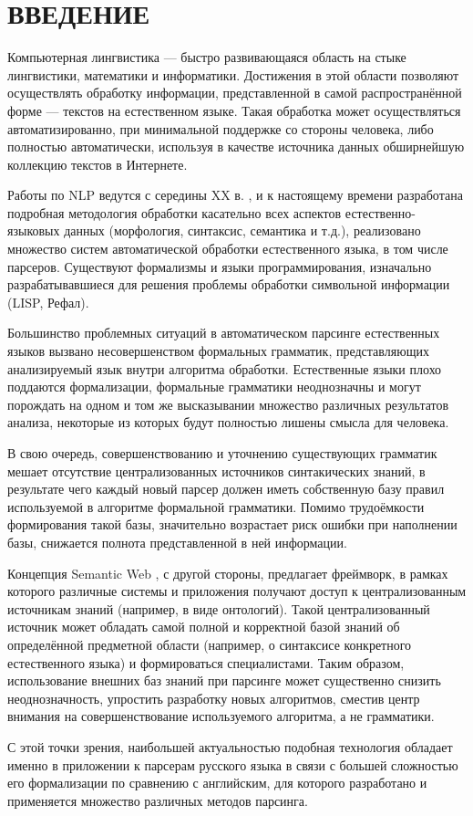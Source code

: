 \section*{\centering ВВЕДЕНИЕ}
Компьютерная лингвистика --- быстро развивающаяся область на стыке лингвистики, математики
и информатики. Достижения в этой области позволяют осуществлять обработку информации, представленной
в самой распространённой форме --- текстов на естественном языке. Такая обработка может осуществляться
автоматизированно, при минимальной поддержке со стороны человека, либо полностью автоматически, используя в качестве
источника данных обширнейшую коллекцию текстов в Интернете.

Работы по NLP ведутся с середины XX в. \cite{wiki_nlp}, и к настоящему времени разработана подробная методология
обработки касательно всех аспектов естественно-языковых данных (морфология, синтаксис, семантика и т.д.), реализовано
множество систем автоматической обработки естественного языка, в том числе парсеров. Существуют формализмы и языки программирования, 
изначально разрабатывавшиеся для решения проблемы обработки символьной информации (LISP, Рефал).

Большинство проблемных ситуаций в автоматическом парсинге естественных языков вызвано несовершенством формальных грамматик, представляющих анализируемый язык внутри алгоритма обработки. Естественные языки плохо поддаются формализации, формальные грамматики неоднозначны и могут порождать на одном и том же высказывании множество различных результатов анализа, некоторые из которых будут полностью лишены смысла для человека.

В свою очередь, совершенствованию и уточнению существующих грамматик мешает отсутствие централизованных источников синтакических знаний, в результате чего каждый новый парсер должен иметь собственную базу правил используемой в алгоритме формальной грамматики. Помимо трудоёмкости формирования такой базы, значительно возрастает риск ошибки при наполнении базы, снижается полнота представленной в ней информации.

Концепция Semantic Web \cite{wiki_semantic_web}, с другой стороны, предлагает фреймворк, в рамках которого различные системы и приложения получают доступ к централизованным источникам знаний (например, в виде онтологий). Такой централизованный источник может обладать самой полной и корректной базой знаний об определённой предметной области (например, о синтаксисе конкретного естественного языка) и формироваться специалистами. Таким образом, использование внешних баз знаний при парсинге может существенно снизить неоднозначность, упростить разработку новых алгоритмов, сместив центр внимания на совершенствование используемого алгоритма, а не грамматики.

С этой точки зрения, наибольшей актуальностью подобная технология обладает именно в приложении к парсерам русского языка в связи с большей сложностью его формализации по сравнению с английским, для которого разработано и применяется множество различных методов парсинга.